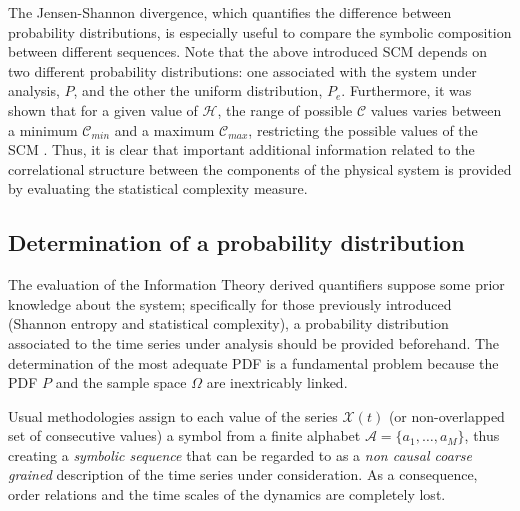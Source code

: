 The Jensen-Shannon divergence, which quantifies the difference between probability distributions, is especially useful to compare the symbolic composition between different sequences\cite{JS-Div1991,Grosse2002,JS-Div2014}.
Note that the above introduced SCM depends on two different probability distributions: one associated with the system under analysis, $P$, and the other the uniform distribution, $P_e$.
Furthermore, it was shown that for a given value of ${\mathcal H}$, the range of possible ${\mathcal C}$ values varies between a minimum ${\mathcal C}_{min}$ and a maximum ${\mathcal C}_{max}$, restricting the possible values of the SCM \cite{Martin2006}.
Thus, it is clear that important additional information related to the correlational structure between the components of the physical system is provided by evaluating the statistical complexity measure. 

\subsection{Determination of a probability distribution}

The evaluation of the Information Theory derived quantifiers suppose some prior knowledge about the system; specifically for those previously introduced (Shannon entropy and statistical complexity), a probability distribution associated to the time series under analysis should be provided beforehand. 
The determination of the most adequate PDF is a fundamental problem because the PDF $P$ and the sample space $\Omega$ are inextricably linked. 

Usual methodologies assign to each value of the series ${\mathcal X}(t)$ (or non-overlapped set of consecutive values) a symbol from a finite alphabet $\mathcal{A}=\{a_1,\dots,a_M\}$, thus creating a {\it symbolic sequence} that can be regarded to as a {\it non causal coarse grained\/} description of the time series under consideration. 
As a consequence, order relations and the time scales of the dynamics are completely lost. 

